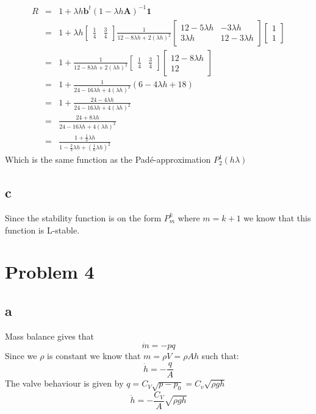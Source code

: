 \documentclass[11pt]{article}
\begin{document}
\begin{eqnarray*}
R &=& 1 + \lambda h \mathbf{b}^t (1 - \lambda h \mathbf{A})^{-1} \mathbf{1} \\
&=& 1 + \lambda h \begin{bmatrix}
\frac{1}{4} & \frac{3}{4} 
\end{bmatrix}
\frac{1}{12 - 8 \lambda h + 2 (\lambda h)^2} 
\begin{bmatrix}
12 - 5 \lambda h & - 3 \lambda h \\
3 \lambda h & 12 - 3 \lambda h
\end{bmatrix}
\begin{bmatrix} 1 \\ 1 \end{bmatrix} \\
&=& 1 + \frac{1}{12 - 8 \lambda h + 2 (\lambda h)^2}
\begin{bmatrix}
\frac{1}{4} & \frac{3}{4} 
\end{bmatrix}
\begin{bmatrix}
12 - 8 \lambda h \\ 12
\end{bmatrix} \\
&=& 1 + \frac{1}{24 - 16 \lambda h + 4 (\lambda h)^2}(6 - 4 \lambda h + 18) \\
&=& 1 + \frac{24 - 4 \lambda h}{24 - 16 \lambda h + 4 (\lambda h)^2} \\
&=& \frac{24 + 8 \lambda h}{24 - 16 \lambda h + 4 (\lambda h)^2} \\
&=& \frac{1 + \frac{1}{3} \lambda h}{1 - \frac{2}{3} \lambda h + (\frac{1}{6} \lambda h)^2}
\end{eqnarray*}
Which is the same function as the Padé-approximation $P^1_2(h \lambda)$

\subsection*{c}
Since the stability function is on the form $P^k_m$ where $m = k + 1$ we know that this function is L-stable.

\section*{Problem 4}
\subsection*{a}
Mass balance gives that
\[\dot{m} = - p q\]
Since we $\rho$ is constant we know that $m = \rho V = \rho A h$ such that:
\[\dot{h} = -\frac{q}{A} \]
The valve behaviour is given by $q = C_V \sqrt{p - p_0} = C_v \sqrt{\rho g h}$
\[\dot{h} = - \frac{C_V}{A} \sqrt{\rho g h} \]
\end{document}
